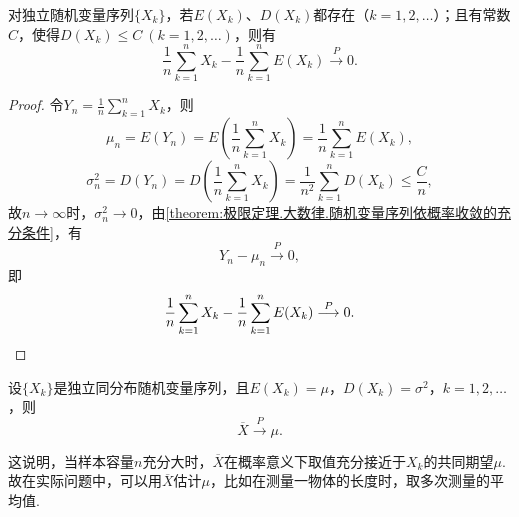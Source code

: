 \begin{theorem}[切比雪夫大数律]\label{theorem:极限定理.大数律.切比雪夫大数律}
对独立随机变量序列\(\{X_k\}\)，若\(E(X_k)\)、\(D(X_k)\)都存在（\(k=1,2,\dotsc\)）；且有常数\(C\)，使得\(D(X_k) \leqslant C\ (k=1,2,\dotsc)\)，则有\[
\frac{1}{n} \sum\limits_{k=1}^n{X_k} - \frac{1}{n} \sum\limits_{k=1}^n{E(X_k)} \overset{P}{\longrightarrow} 0.
\]
\begin{proof}
\def\Yn{\frac{1}{n} \sum\limits_{k=1}^n{X_k}}
令\(Y_n=\Yn\)，则\[
\mu_n = E(Y_n) = E\left(\Yn\right) = \frac{1}{n} \sum\limits_{k=1}^n{E(X_k)},
\]\[
\sigma_n^2 = D(Y_n) = D\left(\Yn\right) = \frac{1}{n^2} \sum\limits_{k=1}^n{D(X_k)} \leqslant \frac{C}{n},
\]
故\(n\to\infty\)时，\(\sigma_n^2\to0\)，由\cref{theorem:极限定理.大数律.随机变量序列依概率收敛的充分条件}，有\[
Y_n - \mu_n \overset{P}{\longrightarrow} 0,
\]即\[
\frac{1}{n} \sum\limits_{k=1}^n{X_k} - \frac{1}{n} \sum\limits_{k=1}^n{E(X_k)} \overset{P}{\longrightarrow} 0.
\qedhere
\]
\end{proof}
\end{theorem}

\begin{corollary}[独立同分布大数律]\label{theorem:极限定理.大数律.独立同分布大数律}
设\(\{X_k\}\)是独立同分布随机变量序列，且\(E(X_k)=\mu\)，\(D(X_k)=\sigma^2\)，\(k=1,2,\dotsc\)，则\[
\overline{X} \overset{P}{\longrightarrow} \mu.
\]
\end{corollary}
这说明，当样本容量\(n\)充分大时，\(\overline{X}\)在概率意义下取值充分接近于\(X_k\)的共同期望\(\mu\).
故在实际问题中，可以用\(\overline{X}\)估计\(\mu\)，比如在测量一物体的长度时，取多次测量的平均值.

